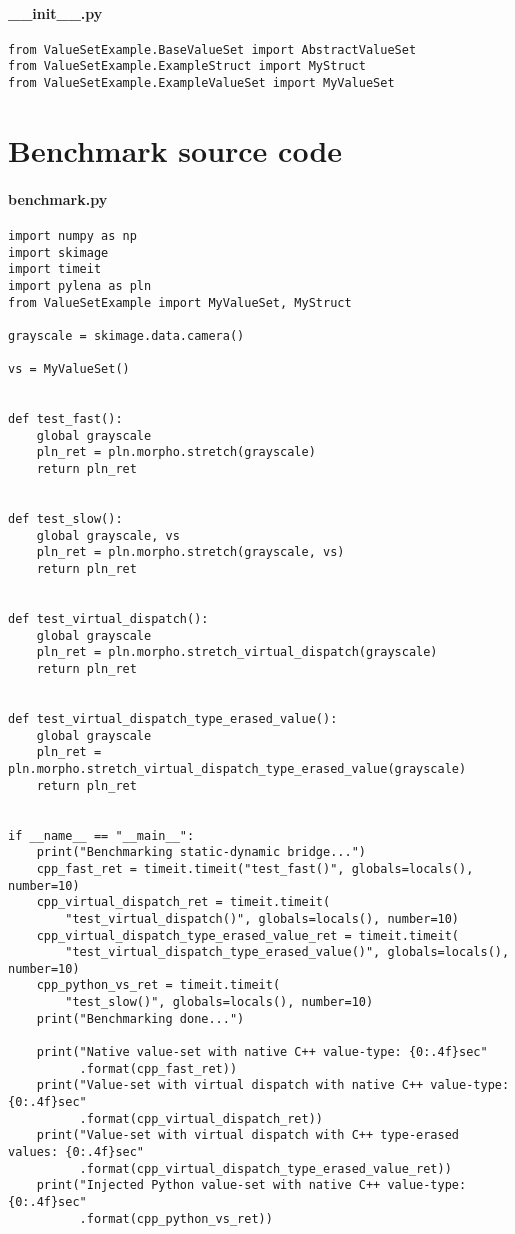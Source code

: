 \paragraph{\_\_init\_\_.py}
\label{appendix:static-dynamic-bridge.python.vs.__init__.py}

\begin{verbatim}
from ValueSetExample.BaseValueSet import AbstractValueSet
from ValueSetExample.ExampleStruct import MyStruct
from ValueSetExample.ExampleValueSet import MyValueSet
\end{verbatim}


\clearpage

\section{Benchmark source code}
\label{appendix:static-dynamic-bridge.benchmark}

\paragraph{benchmark.py}
\label{appendix:static-dynamic-bridge.benchmark.py}

\begin{verbatim}
import numpy as np
import skimage
import timeit
import pylena as pln
from ValueSetExample import MyValueSet, MyStruct

grayscale = skimage.data.camera()

vs = MyValueSet()


def test_fast():
    global grayscale
    pln_ret = pln.morpho.stretch(grayscale)
    return pln_ret


def test_slow():
    global grayscale, vs
    pln_ret = pln.morpho.stretch(grayscale, vs)
    return pln_ret


def test_virtual_dispatch():
    global grayscale
    pln_ret = pln.morpho.stretch_virtual_dispatch(grayscale)
    return pln_ret


def test_virtual_dispatch_type_erased_value():
    global grayscale
    pln_ret = pln.morpho.stretch_virtual_dispatch_type_erased_value(grayscale)
    return pln_ret


if __name__ == "__main__":
    print("Benchmarking static-dynamic bridge...")
    cpp_fast_ret = timeit.timeit("test_fast()", globals=locals(), number=10)
    cpp_virtual_dispatch_ret = timeit.timeit(
        "test_virtual_dispatch()", globals=locals(), number=10)
    cpp_virtual_dispatch_type_erased_value_ret = timeit.timeit(
        "test_virtual_dispatch_type_erased_value()", globals=locals(), number=10)
    cpp_python_vs_ret = timeit.timeit(
        "test_slow()", globals=locals(), number=10)
    print("Benchmarking done...")

    print("Native value-set with native C++ value-type: {0:.4f}sec"
          .format(cpp_fast_ret))
    print("Value-set with virtual dispatch with native C++ value-type: {0:.4f}sec"
          .format(cpp_virtual_dispatch_ret))
    print("Value-set with virtual dispatch with C++ type-erased values: {0:.4f}sec"
          .format(cpp_virtual_dispatch_type_erased_value_ret))
    print("Injected Python value-set with native C++ value-type: {0:.4f}sec"
          .format(cpp_python_vs_ret))
\end{verbatim}
